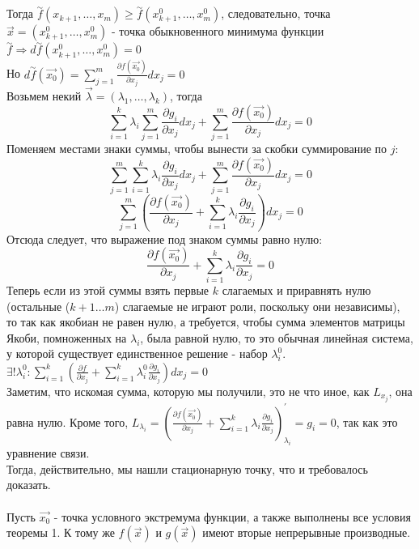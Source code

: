 \documentclass[12pt]{article}
\begin{document}
Тогда $\overset{\sim}{f}(x_{k+1},\dots,x_m) \geq \overset{\sim}{f}(x_{k+1}^0,\dots,x_m^0)$, следовательно, точка $\overrightarrow{x} = (x_{k+1}^0,\dots,x_m^0)$ - точка обыкновенного минимума функции $\overset{\sim}{f} \Rightarrow d\overset{\sim}{f}(x_{k+1}^0,\dots,x_m^0)=0$\\
Но $d\overset{\sim}{f}(\overrightarrow{x_0}) = \sum_{j=1}^m \frac{\partial f(\overrightarrow{x_0})}{\partial x_j} dx_j = 0$\\
Возьмем некий $\overrightarrow{\lambda} = (\lambda_1,\dots,\lambda_k)$, тогда\\
$$\sum_{i=1}^k \lambda_i \sum_{j=1}^m \frac{\partial g_i}{\partial x_j} dx_j + \sum_{j=1}^m \frac{\partial f(\overrightarrow{x_0})}{\partial x_j} dx_j = 0$$
Поменяем местами знаки суммы, чтобы вынести за скобки суммирование по $j$:\\
$$\sum_{j=1}^m \sum_{i=1}^k \lambda_i \frac{\partial g_i}{\partial x_j} dx_j + \sum_{j=1}^m \frac{\partial f(\overrightarrow{x_0})}{\partial x_j} dx_j = 0$$
$$\sum_{j=1}^m (\frac{\partial f(\overrightarrow{x_0})}{\partial x_j} + \sum_{i=1}^k \lambda_i \frac{\partial g_i}{\partial x_j})dx_j= 0$$
Отсюда следует, что выражение под знаком суммы равно нулю:\\
$$\frac{\partial f(\overrightarrow{x_0})}{\partial x_j} + \sum_{i=1}^k \lambda_i \frac{\partial g_i}{\partial x_j} = 0$$
Теперь если из этой суммы взять первые $k$ слагаемых и приравнять нулю (остальные ($k+1 \dots m$) слагаемые не играют роли, поскольку они независимы), то так как якобиан не равен нулю, а требуется, чтобы сумма элементов матрицы Якоби, помноженных на $\lambda_i$, была равной нулю, то это обычная линейная система, у которой существует единственное решение - набор $\lambda_i^0$.\\
$\exists! \lambda_i^0 : \sum_{i=1}^k(\frac{\partial f}{\partial x_j} + \sum_{i=1}^k \lambda_i^0 \frac{\partial g_i}{\partial x_j})dx_j = 0$\\
Заметим, что искомая сумма, которую мы получили, это не что иное, как $L_{x_j}$, она равна нулю. Кроме того, $L_{\lambda_i} = (\frac{\partial f(\overrightarrow{x_0})}{\partial x_j} + \sum_{i=1}^k \lambda_i \frac{\partial g_i}{\partial x_j})^{'}_{\lambda_i} = g_i = 0$, так как это уравнение связи.\\
Тогда, действительно, мы нашли стационарную точку, что и требовалось доказать.
\\
\\
Пусть $\overrightarrow{x_0}$ - точка условного экстремума функции, а также выполнены все условия теоремы 1. К тому же $f(\overrightarrow{x})$ и $g(\overrightarrow{x})$ имеют вторые непрерывные производные.\\
\end{document}

